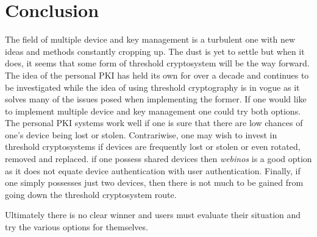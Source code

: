 \section{Conclusion}

The field of multiple device and key management is a turbulent one with new ideas and methods constantly cropping up. The dust is yet to settle but when it does, it seems that some form of threshold cryptosystem will be the way forward. The idea of the personal PKI has held its own for over a decade and continues to be investigated while the idea of using threshold cryptography is in vogue as it solves many of the issues posed when implementing the former. If one would like to implement multiple device and key management one could try both options. The personal PKI systems work well if one is sure that there are low chances of one's device being lost or stolen. Contrariwise, one may wish to invest in threshold cryptosystems if devices are frequently lost or stolen or even rotated, removed and replaced. if one possess shared devices then \textit{webinos} is a good option as it does not equate device authentication with user authentication. Finally, if one simply possesses just two devices, then there is not much to be gained from going down the threshold cryptosystem route.

Ultimately there is no clear winner and users must evaluate their situation and try the various options for themselves.

